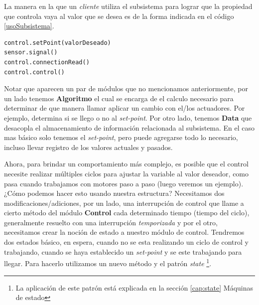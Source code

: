 La manera en la que un \textit{cliente} utiliza el subsistema para lograr que la propiedad que controla vaya al valor que se desea es de la forma indicada en el código \ref{usoSubsistema}.

\begin{lstlisting}[caption=Ejemplo de uso del subsistema.,label={usoSubsistema}]
control.setPoint(valorDeseado)
sensor.signal()
control.connectionRead()
control.control()
\end{lstlisting}

Notar que aparecen un par de módulos que no mencionamos anteriormente, por un lado tenemos \textbf{Algoritmo} el cual se encarga de el calculo necesario para determinar de que manera llamar aplicar un cambio con el/los actuadores. Por ejemplo, determina si se llego o no al \textit{set-point}. Por otro lado, tenemos \textbf{Data} que desacopla el almacenamiento de información relacionada al subsistema. En el caso mas básico solo tenemos el \textit{set-point}, pero puede agregarse todo lo necesario, incluso llevar registro de los valores actuales y pasados.

Ahora, para brindar un comportamiento más complejo, es posible que el control necesite realizar múltiples ciclos para ajustar la variable al valor deseador, como pasa cuando trabajamos con motores paso a paso (luego veremos un ejemplo). ¿Cómo podemos hacer esto usando nuestra estructura? Necesitamos dos modificaciones/adiciones, por un lado, una interrupción de control que llame a cierto método del módulo \textbf{Control} cada determinado tiempo (tiempo del ciclo), generalmente resuelto con una interrupción \textit{temporizada} y por el otro, necesitamos crear la noción de estado a nuestro módulo de control. Tendremos dos estados básico, en espera, cuando no se esta realizando un ciclo de control y trabajando, cuando se haya establecido un \textit{set-point} y se este trabajando para llegar. Para hacerlo utilizamos un nuevo método y el patrón \textit{state} \footnote{La aplicación de este patrón está explicada en la sección \ref{cap:state} Máquinas de estado}.

